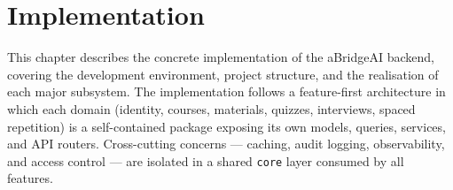\section{Implementation}
\label{sec:implementation}

This chapter describes the concrete implementation of the aBridgeAI backend, covering the development environment, project structure, and the realisation of each major subsystem. The implementation follows a feature-first architecture in which each domain (identity, courses, materials, quizzes, interviews, spaced repetition) is a self-contained package exposing its own models, queries, services, and API routers. Cross-cutting concerns — caching, audit logging, observability, and access control — are isolated in a shared \texttt{core} layer consumed by all features.









